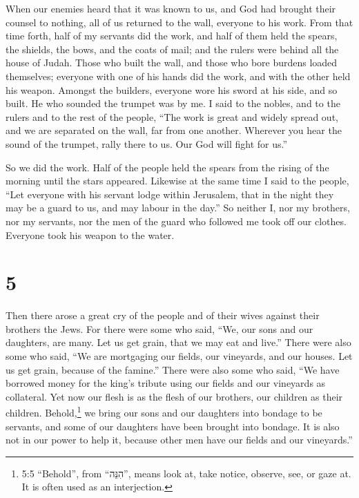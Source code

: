  When our enemies heard that it was known to us, and God
had brought their counsel to nothing, all of us returned to the wall,
everyone to his work.  From that time forth, half of my
servants did the work, and half of them held the spears, the shields,
the bows, and the coats of mail; and the rulers were behind all the
house of Judah.  Those who built the wall, and those who
bore burdens loaded themselves; everyone with one of his hands did the
work, and with the other held his weapon.  Amongst the
builders, everyone wore his sword at his side, and so built. He who
sounded the trumpet was by me.  I said to the nobles, and
to the rulers and to the rest of the people, ``The work is great and
widely spread out, and we are separated on the wall, far from one
another.  Wherever you hear the sound of the trumpet, rally
there to us. Our God will fight for us.''

 So we did the work. Half of the people held the spears
from the rising of the morning until the stars appeared. 
Likewise at the same time I said to the people, ``Let everyone with his
servant lodge within Jerusalem, that in the night they may be a guard to
us, and may labour in the day.''  So neither I, nor my
brothers, nor my servants, nor the men of the guard who followed me took
off our clothes. Everyone took his weapon to the water.

\hypertarget{section-4}{%
\section{5}\label{section-4}}

 Then there arose a great cry of the people and of their
wives against their brothers the Jews.  For there were some
who said, ``We, our sons and our daughters, are many. Let us get grain,
that we may eat and live.''  There were also some who said,
``We are mortgaging our fields, our vineyards, and our houses. Let us
get grain, because of the famine.''  There were also some
who said, ``We have borrowed money for the king's tribute using our
fields and our vineyards as collateral.  Yet now our flesh
is as the flesh of our brothers, our children as their children.
Behold,\footnote{5:5 ``Behold'', from ``הִנֵּה'', means look at, take
  notice, observe, see, or gaze at. It is often used as an interjection.}
we bring our sons and our daughters into bondage to be servants, and
some of our daughters have been brought into bondage. It is also not in
our power to help it, because other men have our fields and our
vineyards.''

